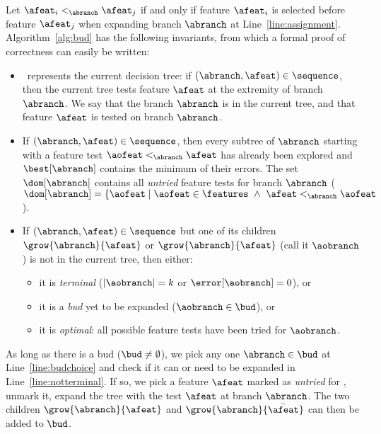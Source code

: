 \documentclass{llncs}
\begin{document}
\medskip

Let $\afeat_i <_{\abranch} \afeat_j$ if and only if feature $\afeat_i$ is selected before feature $\afeat_j$ when expanding branch $\abranch$ at Line~\ref{line:assignment}. Algorithm~\ref{alg:bud} has the following invariants, from which a formal proof of correctness can easily be written:

\begin{itemize}
	\item \sequence\ represents the current decision tree: if $(\abranch,\afeat) \in \sequence$, then the current tree tests feature $\afeat$ at the extremity of branch $\abranch$. We say that the branch $\abranch$ is in the current tree, and that feature $\afeat$ is tested on branch $\abranch$.
	
	\item If $(\abranch,\afeat) \in \sequence$, then every subtree of $\abranch$ starting with a feature test $\aofeat <_{\abranch} \afeat$ has already been explored and $\best[\abranch]$ contains the minimum of their errors. The set $\dom[\abranch]$ contains all \emph{untried} feature tests for branch $\abranch$ ($\dom[\abranch] = \{\aofeat \mid \aofeat \in \features ~\wedge~ \afeat <_{\abranch} \aofeat$).
	
	\item If $(\abranch,\afeat) \in \sequence$ but one of its children $\grow{\abranch}{\afeat}$ or $\grow{\abranch}{\afeat}$ (call it $\aobranch$) is not in the current tree, then either:

	\begin{itemize}
		\item it is \emph{terminal} ($|\aobranch|=k$ or $\error[\aobranch]=0$), or
		\item it is a \emph{bud} yet to be expanded ($\aobranch \in \bud$), or
		\item it is \emph{optimal}: all possible feature tests have been tried for $\aobranch$.
	\end{itemize}
\end{itemize}



As long as there is a bud ($\bud \neq \emptyset$), we pick any one $\abranch \in \bud$ at Line~\ref{line:budchoice} and check if it can or need to be expanded in Line~\ref{line:notterminal}. %
If so, we pick a feature $\afeat$ marked as \emph{untried} for \abranch, unmark it, 
expand the tree with the test $\afeat$ at branch $\abranch$. The two children $\grow{\abranch}{\afeat}$ and $\grow{\abranch}{\bar{\afeat}}$ can then be added to $\bud$.
\end{document}
